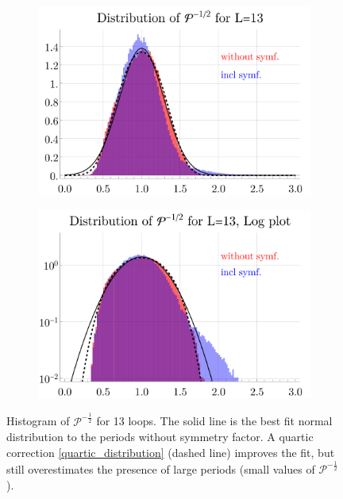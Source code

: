 \documentclass[12pt,a4paper]{article}
\newcommand{\period}{\mathcal P}
\renewcommand{\|}{\rule[-0.4ex]{0.2ex}{1.2em}}
\begin{document}
\begin{figure}[htbp]
	\begin{subfigure}[b]{.48 \textwidth}
		\includegraphics[width=\linewidth]{distribution_sqrt13}
		\subcaption{}
		
	\end{subfigure}
	\begin{subfigure}[b]{.48 \textwidth}
		\includegraphics[width=\linewidth]{distribution_sqrt13_log}
		\subcaption{}
		\label{fig:histogram_sqrt_log}
	\end{subfigure}
	
	\caption{Histogram of $\period^{-\frac 12}$ for 13 loops. The solid line is the best fit normal distribution to the periods without symmetry factor.  A quartic correction \cref{quartic_distribution} (dashed line) improves the fit, but still overestimates the presence of large periods (small values of $\period^{-\frac 12}$). }
	\label{fig:histogram_sqrt}
\end{figure}
\end{document}
